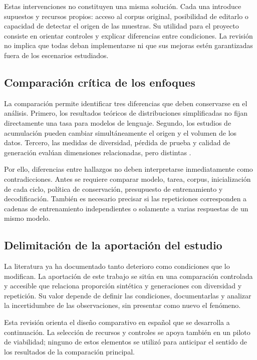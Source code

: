 \documentclass[12pt,letterpaper]{article}
\begin{document}
Estas intervenciones no constituyen una misma solución. Cada una introduce
supuestos y recursos propios: acceso al corpus original, posibilidad de
editarlo o capacidad de detectar el origen de las muestras. Su utilidad
para el proyecto consiste en orientar controles y explicar diferencias entre
condiciones. La revisión no implica que todas deban implementarse ni que
sus mejoras estén garantizadas fuera de los escenarios estudiados.

\subsection{Comparación crítica de los enfoques}

La comparación permite identificar tres diferencias que deben conservarse
en el análisis. Primero, los resultados teóricos de distribuciones
simplificadas no fijan directamente una tasa para modelos de lenguaje.
Segundo, los estudios de acumulación pueden cambiar simultáneamente el
origen y el volumen de los datos. Tercero, las medidas de diversidad,
pérdida de prueba y calidad de generación evalúan dimensiones relacionadas,
pero distintas \cite{suresh2025,kazdan2025,guo2024,drayson2025}.

Por ello, diferencias entre hallazgos no deben interpretarse inmediatamente
como contradicciones. Antes se requiere comparar modelo, tarea, corpus,
inicialización de cada ciclo, política de conservación, presupuesto de
entrenamiento y decodificación. También es necesario precisar si las
repeticiones corresponden a cadenas de entrenamiento independientes o
solamente a varias respuestas de un mismo modelo.

\subsection{Delimitación de la aportación del estudio}

La literatura ya ha documentado tanto deterioro como condiciones que lo
modifican. La aportación de este trabajo se sitúa en una comparación
controlada y accesible que relaciona proporción sintética y generaciones
con diversidad y repetición. Su valor depende de definir las condiciones,
documentarlas y analizar la incertidumbre de las observaciones, sin
presentar como nuevo el fenómeno.

Esta revisión orienta el diseño comparativo en español que se desarrolla
a continuación. La selección de recursos y controles se apoya también en
un piloto de viabilidad; ninguno de estos elementos se utilizó para
anticipar el sentido de los resultados de la comparación principal.
\end{document}
